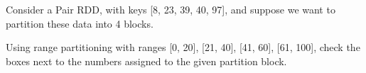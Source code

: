 \begin{questions}

  \bigskip

\question

Consider a Pair RDD, with keys [8, 23, 39, 40, 97], and suppose we want to partition these data into 4 blocks.

Using range partitioning with ranges [0, 20], [21, 40], [41, 60], [61, 100], check the boxes next to the numbers assigned to the given partition block.


\end{questions}
